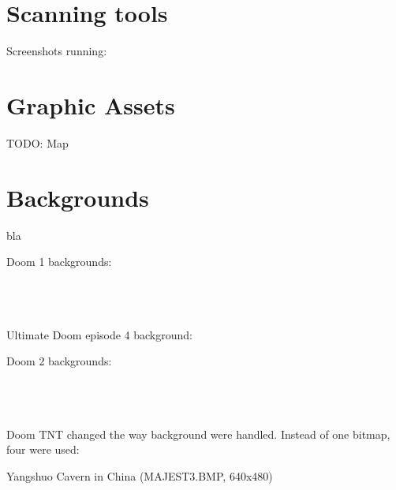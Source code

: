 \section{Scanning tools}
\par
Screenshots running:\\
\par


\section{Graphic Assets}
\par
TODO: Map
\par
{}
\par
{}

\par
\section{Backgrounds}
bla

Doom 1 backgrounds:\\
\par
{}\\
\\
\\

Ultimate Doom episode 4 background:\\
\par
{}

Doom 2 backgrounds:\\
\par
\par
{}\\
\\
\\

Doom TNT changed the way background were handled. Instead of one bitmap, four were used:\\



\begin{minipage}{\textwidth}
\par
Yangshuo Cavern in China (MAJEST3.BMP, 640x480)\\
\par
{}
\end{minipage}
\par


